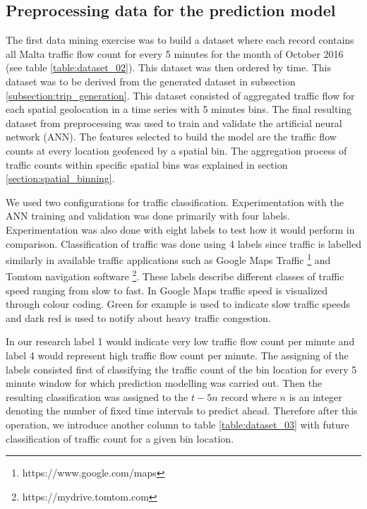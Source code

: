 \documentclass[12pt, a4paper]{report}
\theoremstyle{definition}
\theoremstyle{definition}%
\theoremstyle{definition}%
\theoremstyle{definition}%
\theoremstyle{definition}%
\theoremstyle{definition}%
\begin{document}
\subsection{Preprocessing data for the prediction model} \label{subsection:Preprocessing data for the prediction model}
The first data mining exercise was to build a dataset where each record contains all Malta traffic flow count for every 5 minutes for the month of October 2016 (see table \ref{table:dataset_02}). This dataset was then ordered by time. This dataset was to be derived from the generated dataset in subsection \ref{subsection:trip_generation}. This dataset consisted of aggregated traffic flow for each spatial geolocation in a time series with 5 minutes bins. The final resulting dataset from preprocessing was used to train and validate the artificial neural network (ANN). The features selected to build the model are the traffic flow counts at every location geofenced by a spatial bin. The aggregation process of traffic counts within specific spatial bins was explained in section \ref{section:spatial_binning}.

We used two configurations for traffic classification. Experimentation with the ANN training and validation was done primarily with four labels. Experimentation was also done with eight labels to test how it would perform in comparison. Classification of traffic was done using 4 labels since traffic is labelled similarly in available traffic applications such as Google Maps Traffic \footnote{https://www.google.com/maps} and Tomtom navigation software \footnote{https://mydrive.tomtom.com}. These labels describe different classes of traffic speed ranging from slow to fast. In Google Maps traffic speed is visualized through colour coding. Green for example is used to indicate slow traffic speeds and dark red is used to notify about heavy traffic congestion.  

In our research label 1 would indicate very low traffic flow count per minute and label 4 would represent high traffic flow count per minute. The assigning of the labels consisted first of classifying the traffic count of the bin location for every 5 minute window for which prediction modelling was carried out.  Then the resulting classification was assigned to the $t - 5n$ record where $n$ is an integer denoting the number of fixed time intervals to predict ahead. Therefore after this operation, we introduce another column to table \ref{table:dataset_03} with future classification of traffic count for a given bin location. 
\end{document}
